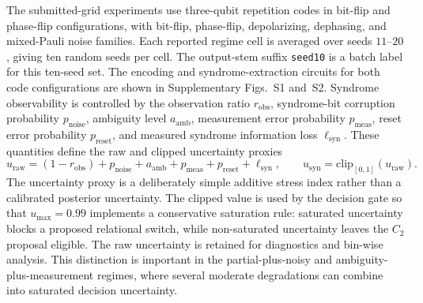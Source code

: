 \documentclass{iopjournal}
\begin{document}
The submitted-grid experiments use three-qubit repetition codes in bit-flip and phase-flip
configurations, with bit-flip, phase-flip, depolarizing, dephasing, and mixed-Pauli
noise families. Each reported regime cell is averaged over seeds $11$--$20$,
giving ten random seeds per cell. The output-stem suffix \texttt{seed10} is a
batch label for this ten-seed set. The encoding and syndrome-extraction circuits
for both code configurations are shown in Supplementary Figs.~S1 and~S2.
Syndrome observability is controlled by the observation ratio
$r_{\mathrm{obs}}$, syndrome-bit corruption probability $p_{\mathrm{noise}}$,
ambiguity level $a_{\mathrm{amb}}$, measurement error probability $p_{\mathrm{meas}}$,
reset error probability $p_{\mathrm{reset}}$, and measured syndrome information loss
$\ell_{\mathrm{syn}}$. These quantities define the raw and clipped uncertainty
proxies
\begin{equation}
u_{\mathrm{raw}}
=
(1-r_{\mathrm{obs}})
+p_{\mathrm{noise}}
+a_{\mathrm{amb}}
+p_{\mathrm{meas}}
+p_{\mathrm{reset}}
+\ell_{\mathrm{syn}},
\qquad
u_{\mathrm{syn}}=\mathrm{clip}_{[0,1]}(u_{\mathrm{raw}}).
\end{equation}
The uncertainty proxy is a deliberately simple additive stress index rather than a
calibrated posterior uncertainty. The clipped value is used by the decision gate
so that $u_{\max}=0.99$ implements a conservative saturation rule: saturated
uncertainty blocks a proposed relational switch, while non-saturated uncertainty
leaves the $C_2$ proposal eligible. The raw uncertainty is retained for diagnostics
and bin-wise analysis. This distinction is important in the partial-plus-noisy and
ambiguity-plus-measurement regimes, where several moderate degradations can combine
into saturated decision uncertainty.
\end{document}
